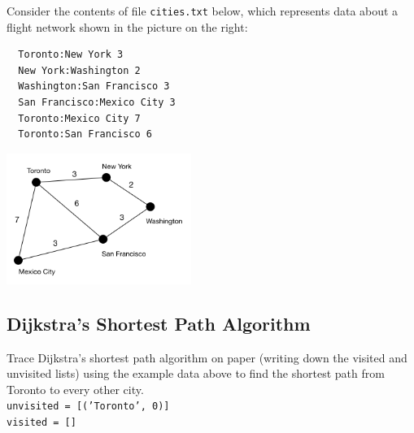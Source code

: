 \documentclass{assignment}
\begin{document}
Consider the contents of file \verb|cities.txt| below, which represents data about a flight network shown in the picture on the right:

\vspace*{-0.3cm}
\begin{minipage}[c]{0.45\linewidth}
\begin{verbatim}
  Toronto:New York 3
  New York:Washington 2
  Washington:San Francisco 3
  San Francisco:Mexico City 3
  Toronto:Mexico City 7
  Toronto:San Francisco 6
\end{verbatim}
\end{minipage}
\hspace{1cm}
\begin{minipage}[c]{0.45\linewidth}
\includegraphics[width=6cm]{figs/map.png}
\end{minipage}

\vspace*{-0.6cm}\subsection*{Dijkstra's Shortest Path Algorithm}

Trace Dijkstra's shortest path algorithm on paper (writing down the visited and unvisited lists) using the example data above to find the shortest path from Toronto to every other city. \\

\texttt{unvisited = [('Toronto', 0)]}\\
\texttt{visited = []}
\end{document}
